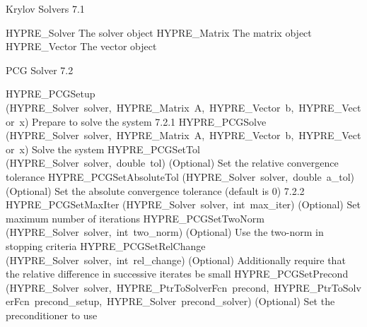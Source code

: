 \documentclass{article}
\begin{document}
\begin{cxxentry}
\begin{cxxdoc}
\end{cxxdoc}
\begin{cxxentry}
{}
        {Krylov Solvers}
        {}
        {
}
        {7.1}
\begin{cxxnames}
        {HYPRE\_Solver}
        {}
        {
The solver object}
        {}
\label{cxx.7.1.1}
        {HYPRE\_Matrix}
        {}
        {
The matrix object}
        {}
\label{cxx.7.1.2}
        {HYPRE\_Vector}
        {}
        {
The vector object}
        {}
\label{cxx.7.1.3}
\end{cxxnames}
\end{cxxentry}
\begin{cxxentry}
{}
        {PCG Solver}
        {}
        {
}
        {7.2}
\begin{cxxnames}
        {HYPRE\_PCGSetup}
        {(HYPRE\_Solver\ solver,\ HYPRE\_Matrix\ A,\ HYPRE\_Vector\ b,\ HYPRE\_Vector\ x)}
        {
Prepare to solve the system}
        {7.2.1}
        {HYPRE\_PCGSolve}
        {(HYPRE\_Solver\ solver,\ HYPRE\_Matrix\ A,\ HYPRE\_Vector\ b,\ HYPRE\_Vector\ x)}
        {
Solve the system}
        {}
\label{cxx.7.2.3}
        {HYPRE\_PCGSetTol}
        {(HYPRE\_Solver\ solver,\ double\ tol)}
        {
(Optional) Set the relative convergence tolerance}
        {}
\label{cxx.7.2.4}
        {HYPRE\_PCGSetAbsoluteTol}
        {(HYPRE\_Solver\ solver,\ double\ a\_tol)}
        {
(Optional) Set the absolute convergence tolerance (default is
0)}
        {7.2.2}
        {HYPRE\_PCGSetMaxIter}
        {(HYPRE\_Solver\ solver,\ int\ max\_iter)}
        {
(Optional) Set maximum number of iterations}
        {}
\label{cxx.7.2.5}
        {HYPRE\_PCGSetTwoNorm}
        {(HYPRE\_Solver\ solver,\ int\ two\_norm)}
        {
(Optional) Use the two-norm in stopping criteria}
        {}
\label{cxx.7.2.6}
        {HYPRE\_PCGSetRelChange}
        {(HYPRE\_Solver\ solver,\ int\ rel\_change)}
        {
(Optional) Additionally require that the relative difference in
successive iterates be small}
        {}
\label{cxx.7.2.7}
        {HYPRE\_PCGSetPrecond}
        {(HYPRE\_Solver\ solver,\ HYPRE\_PtrToSolverFcn\ precond,\ HYPRE\_PtrToSolverFcn\ precond\_setup,\ HYPRE\_Solver\ precond\_solver)}
        {
(Optional) Set the preconditioner to use}
        {}
\label{cxx.7.2.8}

\end{cxxnames}
\end{cxxentry}
\end{cxxentry}
\end{document}
